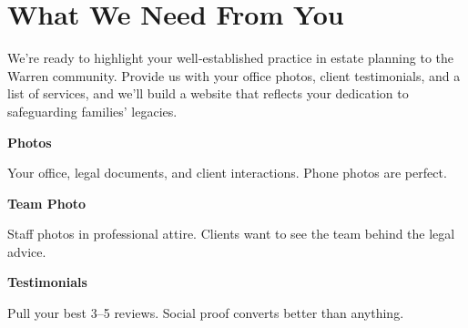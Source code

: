 \documentclass[11pt,letterpaper]{article}
\begin{document}
\vspace{0.2em}

\section*{What We Need From You}

We’re ready to highlight your well‑established practice in estate planning to the Warren community. Provide us with your office photos, client testimonials, and a list of services, and we’ll build a website that reflects your dedication to safeguarding families’ legacies.

\vspace{0.12em}

\noindent\begin{minipage}[t]{0.48\textwidth}
\begin{tcolorbox}[colframe=accent-teal, boxrule=1pt, left=0.7em, right=0.7em, top=0.5em, bottom=0.5em, arc=4pt, boxsep=0pt]
{\bfseries\small\color{accent-teal}Photos}

\vspace{0.15em}

{\small Your office, legal documents, and client interactions. Phone photos are perfect.}
\end{tcolorbox}

\vspace{0.1em}

\begin{tcolorbox}[colframe=accent-teal, boxrule=1pt, left=0.7em, right=0.7em, top=0.5em, bottom=0.5em, arc=4pt, boxsep=0pt]
{\bfseries\small\color{accent-teal}Team Photo}

\vspace{0.15em}

{\small Staff photos in professional attire. Clients want to see the team behind the legal advice.}
\end{tcolorbox}

\vspace{0.1em}

\begin{tcolorbox}[colframe=accent-teal, boxrule=1pt, left=0.7em, right=0.7em, top=0.5em, bottom=0.5em, arc=4pt, boxsep=0pt]
{\bfseries\small\color{accent-teal}Testimonials}

\vspace{0.15em}

{\small Pull your best 3--5 reviews. Social proof converts better than anything.}
\end{tcolorbox}
\end{minipage}
\end{document}
